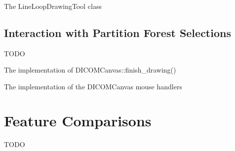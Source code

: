 \begin{stulisting}[p]
\caption{The LineLoopDrawingTool class}
\label{code:appendixval-lineloopdrawingtool}

\end{stulisting}

\newpage

\subsection{Interaction with Partition Forest Selections}
\label{subsec:appendixval-selectioninteraction}

TODO

\begin{stulisting}[p]
\caption{The implementation of DICOMCanvas::finish_drawing()}
\label{code:appendixval-finishdrawing}

\end{stulisting}

\begin{stulisting}[p]
\caption{The implementation of the DICOMCanvas mouse handlers}
\label{code:appendixval-mousehandlers}

\end{stulisting}

\section{Feature Comparisons}

TODO
